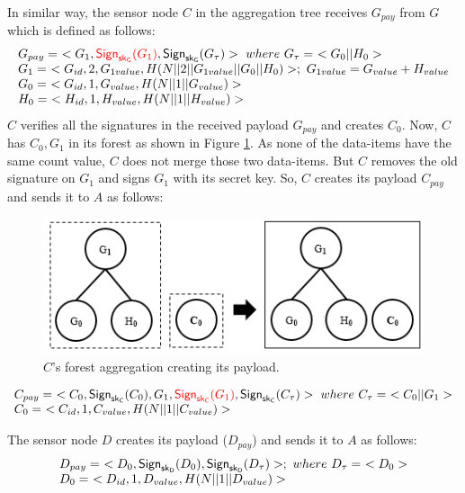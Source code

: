		In similar way, the sensor node $C$ in the aggregation tree receives $G_{pay}$ from $G$ which is defined as follows:
		\begin{equation*}
			\begin{array}{l}
				G_{pay} =\ <G_{1},\textcolor{red}{\textsf{Sign}_{\sf{sk}_{G}}(G_{1})}, \textsf{Sign}_{\sf{sk}_{G}}(G_{\tau})>\ where\ G_{\tau} =\ <G_{0} || H_{0}>\\
				G_{1} =\ < G_{id}, 2, G_{1value}, H(N||2||G_{1value}||G_{0}||H_{0})>;\ G_{1value} = G_{value} + H_{value} \\
				G_{0} =\ <G_{id}, 1, G_{value}, H(N||1||G_{value})>\\
				H_{0} =\ <H_{id}, 1, H_{value}, H(N||1||H_{value})>
			\end{array}
		\end{equation*}
		$C$ verifies all the signatures in the received payload $G_{pay}$ and creates $C_{0}$.
		Now, $C$ has $C_{0},G_{1}$ in its forest as shown in Figure \ref{fig:c-forest-payload}. 
		As none of the data-items have the same count value, $C$ does not merge those two data-items.
		But $C$ removes the old signature on $G_{1}$ and signs $G_{1}$ with its secret key.
		So, $C$ creates its payload $C_{pay}$ and sends it to $A$ as follows:
		\begin{figure}[h!]
			\centering
			\includegraphics{images/c-forest-payload.png}
			\caption{$C$'s forest aggregation creating its payload.}
			\label{fig:c-forest-payload}
		\end{figure}
		\begin{equation*}
			\begin{array}{l}
				C_{pay} =\ <C_{0},\textsf{Sign}_{\sf{sk}_{C}}(C_{0}),G_{1},\textcolor{red}{\textsf{Sign}_{\sf{sk}_{C}}(G_{1})}, \textsf{Sign}_{\sf{sk}_{C}}(C_{\tau})>\ where\ C_{\tau} =\ <C_{0} || G_{1}>\\
				C_{0} =\ <C_{id}, 1, C_{value}, H(N||1||C_{value})>
			\end{array}
		\end{equation*}

		The sensor node $D$ creates its payload ($D_{pay}$) and sends it to $A$ as follows:
		\begin{equation*}
			\begin{array}{l}
				D_{pay} =\ <D_{0}, \textsf{Sign}_{\sf{sk}_{D}}(D_{0}), \textsf{Sign}_{\sf{sk}_{D}}(D_{\tau})>;\ where\ D_{\tau} =\ <D_{0}>\\
				D_{0} =\ <D_{id},1,D_{value},H(N||1||D_{value})>
			\end{array}
		\end{equation*}

